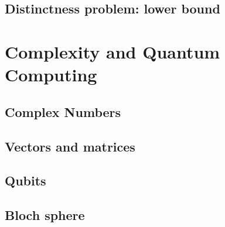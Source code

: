 \documentclass{article}
\theoremstyle{definition}
\begin{document}
\subsection{Distinctness problem: lower bound}

\pagebreak
\section{Complexity and Quantum Computing}
\subsection{Complex Numbers}
\subsection{Vectors and matrices}
\subsection{Qubits}
\subsection{Bloch sphere}
\end{document}
